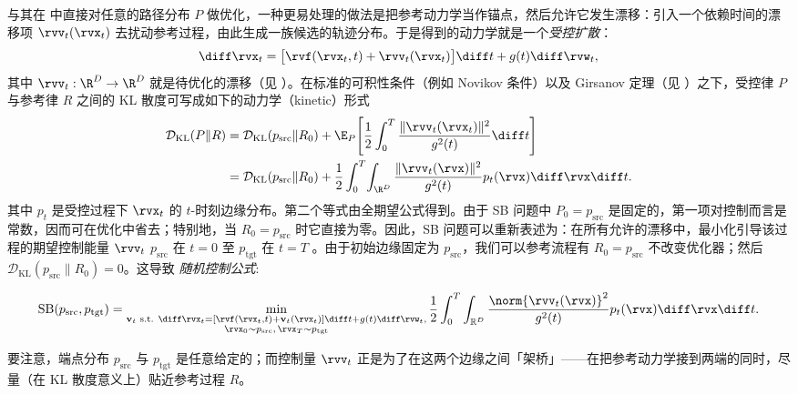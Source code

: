 与其在  中直接对任意的路径分布 $P$ 做优化，一种更易处理的做法是把参考动力学当作锚点，然后允许它发生漂移：引入一个依赖时间的漂移项 $\rvv_t(\rvx_t)$ 去扰动参考过程，由此生成一族候选的轨迹分布。于是得到的动力学就是一个\emph{受控扩散}：
\[
    \diff \rvx_t
    = \bigl[\rvf(\rvx_t,t) + \rvv_t(\rvx_t)\bigr]\diff t + g(t) \diff \rvw_t,
\]
其中 $\rvv_t:\R^D\to\R^D$ 就是待优化的漂移（见 ）。在标准的可积性条件（例如 Novikov 条件）以及 Girsanov 定理（见 ）之下，受控律 $P$ 与参考律 $R$ 之间的 KL 散度可写成如下的动力学（kinetic）形式
\begin{align*}
    \mathcal{D}_{\mathrm{KL}}(P\|R)
    &=
    \mathcal{D}_{\mathrm{KL}}(p_{\mathrm{src}}\|R_0)
    +
    \E_{P}\!\left[
    \frac{1}{2}\int_0^T
    \frac{\|\rvv_t(\rvx_t)\|^2}{g^2(t)}
    \diff t
    \right]
    \\
    &=
    \mathcal{D}_{\mathrm{KL}}(p_{\mathrm{src}}\|R_0)
    +
    \frac{1}{2}\int_0^T\!\int_{\R^D}
    \frac{\|\rvv_t(\rvx)\|^2}{g^2(t)}
    p_t(\rvx)\diff\rvx\diff t .
\end{align*}
其中 $p_t$ 是受控过程下 $\rvx_t$ 的 $t$-时刻边缘分布。第二个等式由全期望公式得到。由于 SB 问题中 $P_0=p_{\mathrm{src}}$ 是固定的，第一项对控制而言是常数，因而可在优化中省去；特别地，当 $R_0=p_{\mathrm{src}}$ 时它直接为零。因此，SB 问题可以重新表述为：在所有允许的漂移中，最小化引导该过程的期望控制能量 $\rvv_t$
$p_{\mathrm{src}}$ 在 $t=0$ 至 $p_{\mathrm{tgt}}$ 在 $t=T$
\citep{dai1991stochastic,pra1990markov,pavon1991free,chen2016relation}。由于初始边缘固定为 $p_{\mathrm{src}}$，我们可以参考流程有 $R_0=p_{\mathrm{src}}$ 不改变优化器；然后
$\mathcal{D}_{\mathrm{KL}}(p_{\mathrm{src}}\|R_0)=0$。这导致 \emph{随机控制公式}:
\begin{mdframed}
\begin{align}\label{eq:sb-kinetic}
\begin{aligned}
\mathrm{SB}(p_{\mathrm{src}}, p_{\mathrm{tgt}})
=
\min_{\substack{
\mathbf{v}_t \text{ s.t. }
\diff \rvx_t =
\left[\rvf(\rvx_t,t)+\mathbf{v}_t(\rvx_t)\right]\diff t
+g(t)\diff\rvw_t,\\
\rvx_0\sim p_{\mathrm{src}},\,
\rvx_T\sim p_{\mathrm{tgt}}
}}
\frac{1}{2}
\int_0^T\int_{\mathbb{R}^D}
\frac{\norm{\rvv_t(\rvx)}^2}{g^2(t)}
p_t(\rvx)\diff\rvx\diff t .
\end{aligned}
\end{align}
\end{mdframed}
要注意，端点分布 $p_{\mathrm{src}}$ 与 $p_{\mathrm{tgt}}$ 是任意给定的；而控制量 $\rvv_t$ 正是为了在这两个边缘之间「架桥」——在把参考动力学接到两端的同时，尽量（在 KL 散度意义上）贴近参考过程 $R$。

